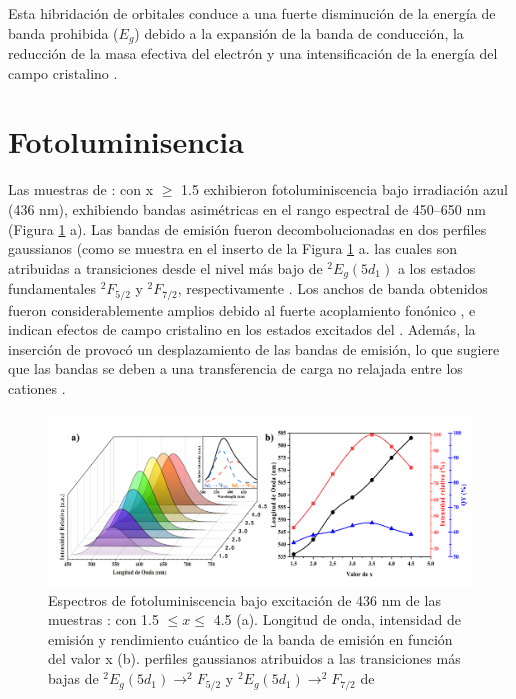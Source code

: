 Esta hibridación de orbitales conduce a una fuerte disminución de la energía de
banda prohibida ($E_g$) debido a la expansión de la banda de conducción, la
reducción de la masa efectiva del electrón y una intensificación de la energía
del campo cristalino \cite{Chen2015a}.\\

\section{Fotoluminisencia}

Las muestras de : con x $\geq $ 1.5
exhibieron fotoluminiscencia
bajo irradiación azul (436 nm), exhibiendo bandas asimétricas en el rango
espectral de 450–650 nm (Figura \ref{fig:foto} a). Las bandas de emisión fueron
decombolucionadas en dos perfiles gaussianos (como se muestra en el inserto de
la Figura \ref{fig:foto} a. las cuales son atribuidas a transiciones desde el
nivel más
bajo de $^2E_g(5d_1)$ a los estados fundamentales $^2F_{5/2}$ y $^2F_{7/2}$,
respectivamente \cite{Yu2014}. Los anchos de banda obtenidos fueron
considerablemente amplios debido
al
fuerte acoplamiento fonónico \cite{Ueda2019}, e indican efectos de campo
cristalino en los
estados excitados del  \cite{Miniscalco1978}. Además, la inserción
de 
provocó un
desplazamiento de las bandas de emisión, lo que sugiere que las bandas se deben
a una transferencia de carga no relajada entre los cationes 
\cite{Zhang2014}.\\

\begin{figure}[h]
    \centering%

    \includegraphics[width=\textwidth]{Kap4/Fotoluminisencia.png}%
    \caption{Espectros de fotoluminiscencia bajo excitación de 436 nm de las
    muestras : con 1.5 $\leq x \leq  $ 4.5
    (a). Longitud de onda, intensidad de emisión y rendimiento cuántico de la
    banda
    de emisión en función del valor x (b). perfiles gaussianos atribuidos a las
    transiciones más bajas de $^2E_g(5d_1)\rightarrow ^2F_{5/2}$ y $^2E_g(5d_1)
        \rightarrow ^2F_{7/2}$ de }\label{fig:foto}
\end{figure}

